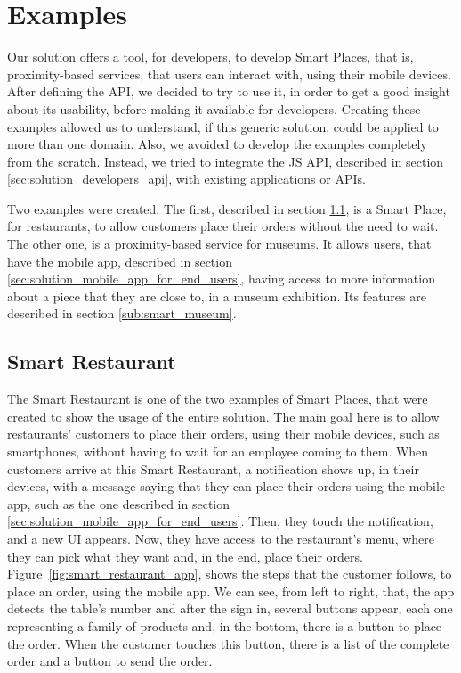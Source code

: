\section{Examples}
\label{sec:solution_examples}
Our solution offers a tool, for developers, to develop Smart Places, that is, proximity-based services, that users can interact with, using their mobile devices.
After defining the \gls{API}, we decided to try to use it, in order to get a good insight about its usability, before making it available for developers.
Creating these examples allowed us to understand, if this generic solution, could be applied to more than one domain.
Also, we avoided to develop the examples completely from the scratch.
Instead, we tried to integrate the \gls{JS} \gls{API}, described in section \ref{sec:solution_developers_api}, with existing applications or \glspl{API}.

Two examples were created.
The first, described in section \ref{sub:solution_smart_restaurant}, is a Smart Place, for restaurants, to allow customers place their orders without the need to wait.
The other one, is a proximity-based service for museums.
It allows users, that have the mobile app, described in section \ref{sec:solution_mobile_app_for_end_users}, having access to more information about a piece that they are close to, in a museum exhibition.
Its features are described in section \ref{sub:smart_museum}.

\subsection{Smart Restaurant}
\label{sub:solution_smart_restaurant}
The Smart Restaurant is one of the two examples of Smart Places, that were created to show the usage of the entire solution.
The main goal here is to allow restaurants' customers to place their orders, using their mobile devices, such as smartphones, without having to wait for an employee coming to them.
When customers arrive at this Smart Restaurant, a notification shows up, in their devices, with a message saying that they can place their orders using the mobile app, such as the one described in section \ref{sec:solution_mobile_app_for_end_users}.
Then, they touch the notification, and a new \gls{UI} appears.
Now, they have access to the restaurant's menu, where they can pick what they want and, in the end, place their orders.
Figure~\ref{fig:smart_restaurant_app}, shows the steps that the customer follows, to place an order, using the mobile app. We can see, from left to right, that, the app detects the table's number and after the sign in, several buttons appear, each one representing a family of products and, in the bottom, there is a button to place the order.
When the customer touches this button, there is a list of the complete order and a button to send the order.

